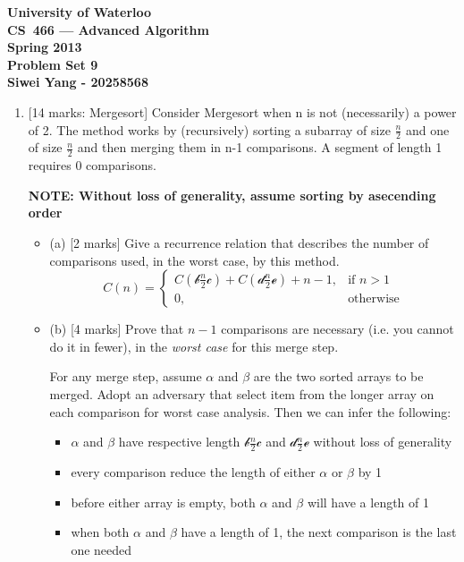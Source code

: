 \documentclass[12pt]{article}
\begin{document}
\begin{center}
\large\bf University of Waterloo\\
CS~466 --- Advanced Algorithm\\
Spring 2013\\
Problem Set 9\\
Siwei Yang - 20258568\\
\end{center}
\bigskip

\begin{enumerate}

\item{} [14 marks: Mergesort]
Consider Mergesort when n is not (necessarily) a power of 2. The method works by (recursively) sorting a subarray of size $\frac{n}{2}$ and one of size $\frac{n}{2}$ and then merging them in n-1 comparisons. A segment of length 1 requires 0 comparisons.

\textbf{NOTE: Without loss of generality, assume sorting by asecending order}
\begin{itemize}
\item{(a)} [2 marks]
Give a recurrence relation that describes the number of comparisons used, in the worst case, by this method.
\begin{equation}
C(n) =
\begin{cases}
    C(\mathcal{b} \frac{n}{2} \mathcal{c}) + C(\mathcal{d} \frac{n}{2} \mathcal{e}) + n - 1,& \text{if } n > 1\\
    0,              & \text{otherwise}
\end{cases}
\end{equation}

\item{(b)} [4 marks]
Prove that $n - 1$ comparisons are necessary (i.e. you cannot do it in fewer), in the \textit{worst case} for this merge step.

For any merge step, assume $\alpha$ and $\beta$ are the two sorted arrays to be merged. Adopt an adversary that select item from the longer array on each comparison for worst case analysis. Then we can infer the following:
\begin{itemize}
\item{} $\alpha$ and $\beta$ have respective length $\mathcal{b} \frac{n}{2} \mathcal{c}$ and $\mathcal{d} \frac{n}{2} \mathcal{e}$ without loss of generality
\item{} every comparison reduce the length of either $\alpha$ or $\beta$ by 1
\item{} before either array is empty, both $\alpha$ and $\beta$ will have a length of 1
\item{} when both $\alpha$ and $\beta$ have a length of 1, the next comparison is the last one needed
\end{itemize}


\end{itemize}
\end{enumerate}
\end{document}
